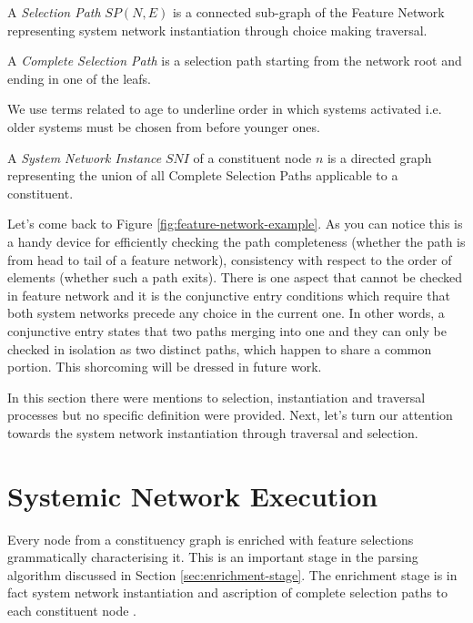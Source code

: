 \begin{definition}\label{def:selection-path}
A \textit{Selection Path} $SP(N,E)$ is a connected sub-graph of the Feature Network representing system network instantiation through choice making traversal.
\end{definition}

\begin{definition}\label{def:complete-selection-path}
A \textit{Complete Selection Path} is a selection path starting from the network root and ending in one of the leafs.
\end{definition}

We use terms related to age to underline order in which systems activated i.e. older systems must be chosen from before younger ones. 

\begin{definition}\label{def:system-network-instance}
A \textit{System Network Instance} $SNI$ of a constituent node $n$ is a directed graph representing the union of all Complete Selection Paths applicable to a constituent. 
\end{definition}

Let's come back to Figure \ref{fig:feature-network-example}. As you can notice this is a handy device for efficiently checking the path completeness (whether the path is from head to tail of a feature network), consistency with respect to the order of elements (whether such a path exits). There is one aspect that cannot be checked in feature network and it is the conjunctive entry conditions which require that both system networks precede any choice in the current one. In other words, a conjunctive entry states that two paths merging into one and they can only be checked in isolation as two distinct paths, which happen to share a common portion. This shorcoming will be dressed in future work.

In this section there were mentions to selection, instantiation and traversal processes but no specific definition were provided. Next, let's turn our attention towards the system network instantiation through traversal and selection. 

\section{Systemic Network Execution}
\label{sec:system-network-execution}
Every node from a constituency graph is enriched with feature selections grammatically characterising it. This is an important stage in the parsing algorithm discussed in Section \ref{sec:enrichment-stage}. The enrichment stage is in fact system network instantiation and ascription of complete selection paths to each constituent node . 

